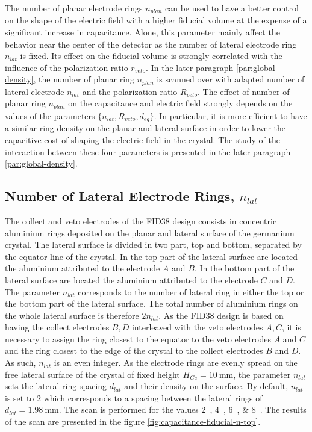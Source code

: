 The number of planar electrode rings $n_{plan}$ can be used to have a better control on the shape of the electric field with a higher fiducial volume at the expense of a significant increase in capacitance. Alone, this parameter mainly affect the behavior near the center of the detector as the number of lateral electrode ring $n_{lat}$ is fixed. Its effect on the fiducial volume is strongly correlated with the influence of the polarization ratio $r_{veto}$. In the later paragraph \ref{par:global-density}, the number of planar ring $n_{plan}$ is scanned over with adapted number of lateral electrode $n_{lat}$ and the polarization ratio $R_{veto}$.
The effect of number of planar ring $n_{plan}$ on the capacitance and electric field strongly depends on the values of the parameters $\{n_{lat}, R_{veto}, d_{eq}\}$. In particular, it is more efficient to have a similar ring density on the planar and lateral surface in order to lower the capacitive cost of shaping the electric field in the crystal. The study of the interaction between these four parameters is presented in the later paragraph \ref{par:global-density}.


\subsection{Number of Lateral Electrode Rings, $n_{lat}$}
\label{par:n-lat}

The collect and veto electrodes of the FID38 design consists in concentric aluminium rings deposited on the planar and lateral surface of the germanium crystal. The lateral surface is divided in two part, top and bottom, separated by the equator line of the crystal. In the top part of the lateral surface are located the aluminium attributed to the electrode $A$ and $B$. In the bottom part of the lateral surface are located the aluminium attributed to the electrode $C$ and $D$. The parameter $n_{lat}$ corresponds to the number of lateral ring in either the top or the bottom part of the lateral surface. The total number of aluminium rings on the whole lateral surface is therefore $2 n_{lat}$. As the FID38 design is based on having the collect electrodes $B,D$ interleaved with the veto electrodes $A,C$, it is necessary to assign the ring closest to the equator to the veto electrodes $A$ and $C$ and the ring closest to the edge of the crystal to the collect electrodes $B$ and $D$. As such, $n_{lat}$ is an even integer. As the electrode rings are evenly spread on the free lateral surface of the crystal of fixed height $H_{Ge}=\SI{10}{\mm}$, the parameter $n_{lat}$ sets the lateral ring spacing $d_{lat}$ and their density on the surface. By default, $n_{lat}$ is set to $2$ which corresponds to a spacing between the lateral rings of $d_{lat}=\SI{1.98}{\mm}$.  The scan is performed for the values \SIlist{2; 4; 6; 8}{}. The results of the scan are presented in the figure \ref{fig:capacitance-fiducial-n-top}.

